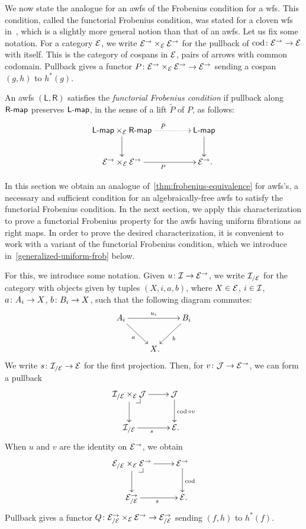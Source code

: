 \documentclass[reqno,10pt,a4paper,oneside,draft]{amsart}
\newcommand{\LL}{\mathsf{L}}
\newcommand{\RR}{\mathsf{R}}
\begin{document}
{{We now state the analogue for an awfs of the Frobenius condition for a wfs.
This condition, called the functorial Frobenius condition, was stated for a cloven wfs in~\cite{garner:topological-simplicial}, which is a slightly more general notion than
that of an awfs.
Let us fix some notation.
For a category $\cal{E}$, we write $\cal{E}^\to \times_\cal{E} \cal{E}^\to$ for the pullback of $\cod \co \cal{E}^\to \to \cal{E}$ with itself.
This is the category of cospans in $\cal{E}$, \ie pairs of arrows with common codomain.
Pullback gives a functor $P \co  \cal{E}^\to \times_{\cal{E}} \cal{E}^\to \to \cal{E}^\to$ sending a cospan $(g, h)$ to $h^*(g)$.

\begin{definition} \label{functorial-frobenius}
An awfs $(\LL, \RR)$ satisfies the \emph{functorial Frobenius condition} if pullback along $\palg{\RR}$ preserves $\pcoalg{\LL}$, in the sense of a lift $\tilde{P}$ of $P$, as follows:
\[
\xymatrix@C+2em{
  \pcoalg{\LL} \times_{\cal{E}} \palg{\RR}
  \ar@{.>}[r]^{\tilde{P}}
  \ar[d]
&
  \pcoalg{\LL}
  \ar[d]
\\
  \cal{E}^\to \times_{\cal{E}} \cal{E}^\to
  \ar[r]_{P}
&
  \cal{E}^\to
\rlap{.}}
\]
\end{definition}

In this section we obtain an analogue of~\cref{thm:frobenius-equivalence} for awfs's, \ie a necessary and sufficient condition for an algebraically-free awfs to satisfy the functorial Frobenius condition.
In the next section, we apply this characterization to prove a functorial Frobenius property for the awfs having uniform fibrations as right maps.
In order to prove the desired characterization, it is convenient to work with a variant of the functorial Frobenius condition, which we introduce in~\cref{generalized-uniform-frob} below.

For this, we introduce some notation.
Given $u \co \cal{I} \to \cal{E}^\to$, we write $\cal{I}_{/\cal{E}}$ for the category with objects given by
tuples $(X, i, a, b)$, where $X \in \cal{E}$, $i \in \cal{I}$, $a \co A_i \to X$, $b \co B_i \to X$, such that the following diagram commutes:
\[
\xymatrix{
A_i \ar[dr]_a \ar[rr]^{u_i} & & B_i \ar[dl]^{b} \\
 & X \rlap{.} & }
\]
We write $s \co \cal{I}_{/\cal{E}} \to \cal{E}$ for the first projection.
Then, for $v \co \cal{J} \to \cal{E}^\to$, we can form a pullback
\[
\xymatrix{
  \cal{I}_{/\cal{E}} \times_{\cal{E}} \cal{J}
  \ar[r]
  \ar[d]
  \pullback{dr}
&
  \cal{J}
  \ar[d]^{\cod \cc v}
\\
  \cal{I}_{/\cal{E}}
  \ar[r]_s
&
  \cal{E}
\rlap{.}}
\]
When $u$ and $v$ are the identity on $\cal{E}^\to$, we obtain
\[
\xymatrix{
  \cal{E}_{/\cal{E}} \times_{\cal{E}} \cal{E}^\to
  \ar[r]
  \ar[d]
  \pullback{dr}
&
  \cal{E}^\to
  \ar[d]^{\cod}
\\
  \cal{E}^\to_{/\cal{E}}
  \ar[r]_s
&
  \cal{E}
\rlap{.}}
\]
Pullback gives a functor $Q \co  \cal{E}^\to_{/\cal{E}} \times_{\cal{E}} \cal{E}^\to \to \cal{E}_{/\cal{E}}^\to$ sending $(f, h)$ to $h^*(f)$.

}}
\end{document}
